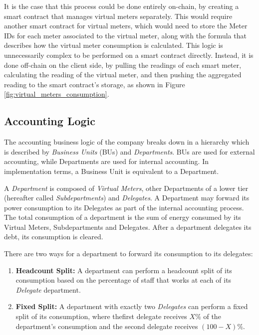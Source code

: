 It is the case that this process could be done entirely on-chain, by creating a smart contract that manages virtual meters separately. This would require another smart contract for virtual meters, which would need to store the Meter IDs for each meter associated to the virtual meter, along with the formula that describes how the virtual meter consumption is calculated. This logic is unnecessarily complex to be performed on a smart contract directly. Instead, it is done off-chain on the client side, by pulling the readings of each smart meter, calculating the reading of the virtual meter, and then pushing the aggregated reading to the smart contract's storage, as shown in Figure \ref{fig:virtual_meters_consumption}.


\subsection{Accounting Logic} \label{billing}

The accounting business logic of the company breaks down in a hierarchy which is described by \textit{Business Units} (BUs) and \textit{Departments}. BUs are used for external accounting, while Departments are used for internal accounting. In implementation terms, a Business Unit is equivalent to a Department.
 
A \textit{Department} is composed of \textit{Virtual Meters}, other Departments of a lower tier (hereafter called \textit{Subdepartments}) and \textit{Delegates}. A Department may forward its power consumption to its Delegates as part of the internal accounting process. The total consumption of a department is the sum of energy consumed by its Virtual Meters, Subdepartments and Delegates. After a department delegates its debt, its consumption is cleared.

There are two ways for a department to forward its consumption to its delegates:

\begin{enumerate}
    \item \textbf{Headcount Split:} A department can perform a headcount split of its consumption based on the percentage of staff that works at each of its \textit{Delegate} department.
    \item \textbf{Fixed Split:} A department with exactly two \textit{Delegates} can perform a fixed split of its consumption, where thefirst delegate receives $X\%$ of the department's consumption and the second delegate receives $(100-X)\%$.
\end{enumerate}

